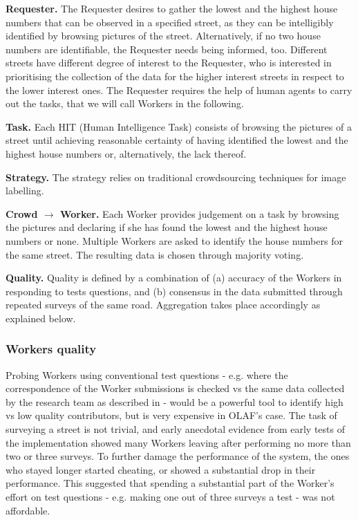 \textbf{Requester.} The Requester desires to gather the lowest and the highest house numbers that can be observed in a specified street, as they can be intelligibly identified by browsing pictures of the street. Alternatively, if no two house numbers are identifiable, the Requester needs being informed, too. Different streets have different degree of interest to the Requester, who is interested in prioritising the collection of the data for the higher interest streets in respect to the lower interest ones. The Requester requires the help of human agents to carry out the tasks, that we will call Workers in the following.

\textbf{Task.} Each HIT (Human Intelligence Task) consists of browsing the pictures of a street until achieving reasonable certainty of having identified the lowest and the highest house numbers or, alternatively, the lack thereof.

\textbf{Strategy.} 
The strategy relies on traditional crowdsourcing techniques for image labelling.

\textbf{Crowd $\rightarrow$ Worker.} Each Worker provides judgement on a task by browsing the pictures and declaring if she has found the lowest and the highest house numbers or none. Multiple Workers are asked to identify the house numbers for the same street. The resulting data is chosen through majority voting.

\textbf{Quality.} Quality is defined by a combination of (a) accuracy of the Workers in responding to tests questions, and (b) consensus in the data submitted through repeated surveys of the same road. Aggregation takes place accordingly as explained below.

\subsubsection{Workers quality}
    
Probing Workers using conventional test questions - e.g. where the correspondence of the Worker submissions is checked vs the same data collected by the research team as described in \cite{Kittur:2008gj} - would be a powerful tool to identify high vs low quality contributors, but is very expensive in OLAF's case. The task of surveying a street is not trivial, and early anecdotal evidence from early tests of the implementation showed many Workers leaving after performing no more than two or three surveys. To further damage the performance of the system, the ones who stayed longer started cheating, or showed a substantial drop in their performance. This suggested that spending a substantial part of the Worker's effort on test questions - e.g. making one out of three surveys a test - was not affordable.

